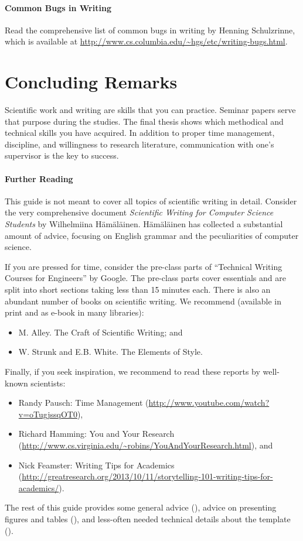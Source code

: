 \paragraph{Common Bugs in Writing}
\label{par:commonbugs}
Read the comprehensive list of common bugs in writing by Henning Schulzrinne, which is available at \url{http://www.cs.columbia.edu/~hgs/etc/writing-bugs.html}.

\section{Concluding Remarks}

Scientific work and writing are skills that you can practice. Seminar papers serve that purpose during the studies. The final thesis shows which methodical and technical skills you have acquired. In addition to proper time management, discipline, and willingness to research literature, communication with one's supervisor is the key to success.

\paragraph{Further Reading}

This guide is not meant to cover all topics of scientific writing in detail. Consider the very comprehensive document \emph{Scientific Writing for Computer Science Students} by Wilhelmiina Hämäläinen.%
Hämäläinen has collected a substantial amount of advice, focusing on English grammar and the peculiarities of computer science.

If you are pressed for time, consider the pre-class parts of ``Technical Writing Courses for Engineers'' by Google. The pre-class parts cover essentials and are split into short sections taking less than 15 minutes each.
There is also an abundant number of books on scientific writing. We recommend  (available in print and as e-book in many libraries):
\begin{itemize}
\item M. Alley. The Craft of Scientific Writing; and
\item W. Strunk and E.B. White. The Elements of Style.
\end{itemize}

Finally, if you seek inspiration, we recommend to read these reports by well-known scientists:
\begin{itemize}
\item Randy Pausch: Time Management (\url{http://www.youtube.com/watch?v=oTugjssqOT0}),
\item Richard Hamming: You and Your Research (\url{http://www.cs.virginia.edu/~robins/YouAndYourResearch.html}), and
\item Nick Feamster: Writing Tips for Academics (\url{http://greatresearch.org/2013/10/11/storytelling-101-writing-tips-for-academics/}).
\end{itemize}

The rest of this guide provides some general advice (), advice on presenting figures and tables (), and less-often needed technical details about the template ().